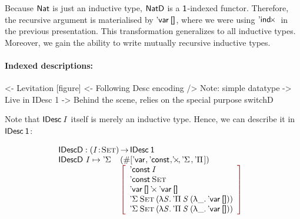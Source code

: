 Because $\Nat$ is just an inductive type, $\NatD$ is a $\Unit$-indexed
functor. Therefore, the recursive argument is materialised by
$\DVar{\Void}$, where we were using $\DIndx$ in the previous
presentation. This transformation generalizes to all inductive
types. Moreover, we gain the ability to write mutually recursive
inductive types.



\paragraph{Indexed descriptions:}

\begin{wstructure}
<- Levitation [figure]
    <- Following Desc encoding
        /> Note: simple datatype
            -> Live in IDesc 1
    -> Behind the scene, relies on the special purpose switchD
\end{wstructure}

Note that $\IDesc{\V{I}}$ itself is merely an inductive type. Hence,
we can describe it in $\IDesc{\Unit}$:

\[\stk{
\IDescD : \PI{\V{I}}{\Set} \IDesc{\Unit} \\
\begin{array}{@{}ll}
\IDescD~\V{I} \mapsto \DSigma{\!}{\!} & (\EnumT \red{[} 
                                          \DVar{\!},
                                          \DConst{\!},
                                          \DProd{\!}{\!},
                                          \DSigma{\!}{\!}, 
                                          \DPi{\!}{\!}
                                             \red{]}) \\
                              & \bigRedBracket{\begin{array}{l}
                                      \DConst{\V{I}}                  \\
                                      \DConst{\Set}               \\
                                      \DProd{\DVar{\Void}}{\DVar{\Void}}  \\
                                      \DSigma{\Set}{(\LAM{\V{S}} \DPi{\V{S}}{(\LAM{\_} \DVar{\Void})})} \\
                                      \DSigma{\Set}{(\LAM{\V{S}} \DPi{\V{S}}{(\LAM{\_} \DVar{\Void})})}
                                   \end{array}
                             }
\end{array}
}\]

